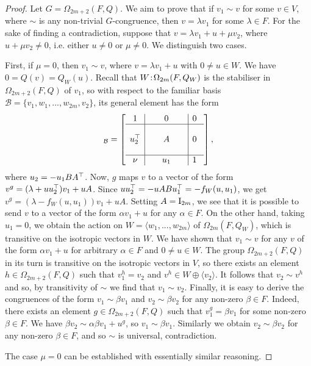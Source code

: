 \begin{proof}
	Let $G = \Omega_{2m+2}(F,Q)$. We aim to prove that if $v_1 \sim v$ for some $v \in V$, where
	$\sim$ is any non-trivial $G$-congruence, then $v = \lambda v_1$ for some $\lambda \in F$. 
	For the sake of finding a contradiction, suppose that $v = \lambda v_1 + u + \mu v_2$,
	where $u + \mu v_2 \neq 0$, i.e. either $u \neq 0$ or $\mu \neq 0$. We distinguish two cases.
	
	First, if $\mu = 0$, then $v_1 \sim v$, where $v = \lambda v_1 + u$ with $0\neq u \in W$.
	We have $0 = Q(v) = Q_W(u)$. 
	Recall that $W\mathord{{\;\!{:}\;\!}} \Omega_{2m}(F,Q_W)$ is the stabiliser in $\Omega_{2m+2}(F, Q)$ of $v_1$,
	so with respect to the familiar basis $\mathcal{B} = \{v_1, w_1 ,..., w_{2m}, v_2\}$,
	its general element has the form 
	\begin{equation*}
	[g]_{\mathcal{B}}=\left[
	    \begin{array}{c|c|c}
		1 & 0 & 0\  \\ \hline 
		 & & \\
		u_2^\T &\ \ \ \ \ A\ \ \ \ \  & 0\  \\ 
		 & & \\ \hline 
		\nu & u_1 & 1\ 
	    \end{array}
	\right],
	\end{equation*}
	where $u_2 = -u_1 BA^{\top}$. Now, $g$ maps $v$ to a vector of the form \mbox{$v^g = 
	(\lambda + u u_2^{\top}) v_1 + uA$}. Since $u u_2^{\top} = 
	-u A B u_1^{\top} = - f_W(u, u_1)$, we get \mbox{$v^g = (\lambda - f_W(u, u_1))v_1 + uA$}.
	Setting $A = \mathord{\mathrm{I}}_{2m}$, we see that it is possible to send $v$ to a vector
	of the form $\alpha v_1 + u$ for any $\alpha \in F$. On the other hand, taking $u_1 = 0$,
	we obtain the action on \mbox{$W = \langle w_1, ..., w_{2m} \rangle$} 
	of $\Omega_{2m}(F,Q_W)$, which is 
	transitive on the isotropic vectors in $W$. We have shown that $v_1 \sim v$ for any $v$ of
	the form $\alpha v_1 + u$ for arbitrary $\alpha \in F$ and $0\neq u \in W$. 
	The group $\Omega_{2m+2}(F,Q)$	in 
	its turn is transitive on the isotropic vectors in $V$, so there exists an element
	\mbox{$h \in \Omega_{2m+2}(F,Q)$} such that $v_1^h = v_2$ and $v^h \in W \oplus \langle v_2 \rangle$. 
	It follows that $v_2 \sim v^h$ and so, by transitivity of $\sim$ we find that 
	$v_1 \sim v_2$. Finally, it is easy to derive the congruences of the form 
	$v_1 \sim \beta v_1$ and $v_2 \sim \beta v_2$ for any non-zero $\beta \in F$. Indeed, 
	there exists an element \mbox{$g \in  \Omega_{2m+2}(F,Q)$} such that $v_1^g = \beta v_1$ for some non-zero
	$\beta \in F$. We have 
\mbox{$\beta v_2 \sim \alpha \beta v_1 + u^g$}, so \mbox{$v_1 \sim \beta v_1$}. Similarly we obtain
	$v_2 \sim \beta v_2$ for any non-zero $\beta \in F$, and so $\sim$ is universal, contradiction.

The case $\mu = 0$ can be established with 
essentially similar reasoning. 
	
	
\end{proof}


